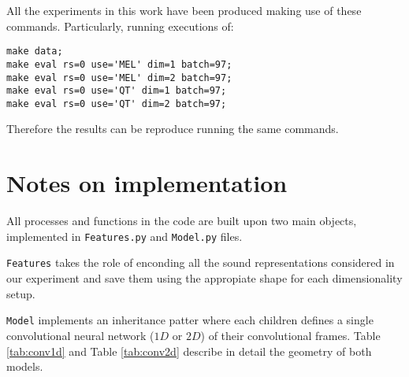 All the experiments in this work have been produced making use of these commands. Particularly, running executions of:


\begin{verbatim}
make data;
make eval rs=0 use='MEL' dim=1 batch=97;
make eval rs=0 use='MEL' dim=2 batch=97;
make eval rs=0 use='QT' dim=1 batch=97;
make eval rs=0 use='QT' dim=2 batch=97;
\end{verbatim}

Therefore the results can be reproduce running the same commands.

\section{Notes on implementation}

All processes and functions in the code are built upon two main objects, implemented in \texttt{Features.py} and \texttt{Model.py} files.


\texttt{Features} takes the role of enconding all  the sound representations considered in our experiment and save them using the appropiate shape for each dimensionality setup.

\texttt{Model} implements an inheritance patter where each children defines a single convolutional neural network ($1D$ or $2D$) of their convolutional frames. Table \ref{tab:conv1d} and Table \ref{tab:conv2d} describe in detail the geometry of both models.

